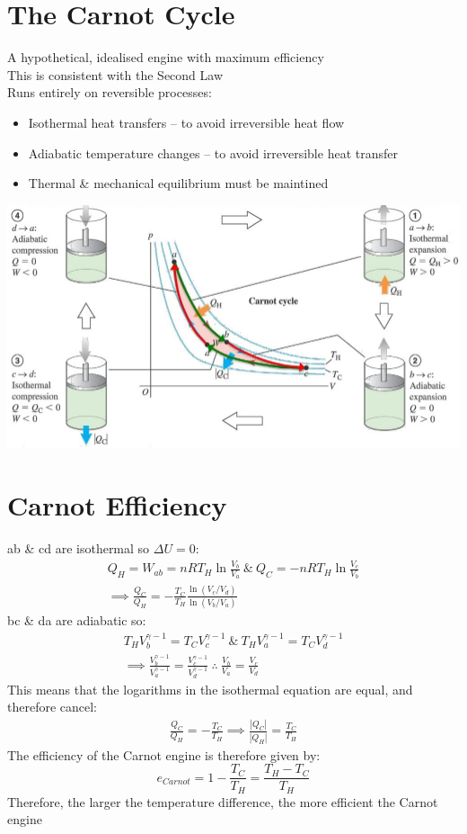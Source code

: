 \documentclass[a4paper, 11pt, fleqn, normalem]{report}
\begin{document}
\section{The Carnot Cycle}
A hypothetical, idealised engine with maximum efficiency \\
This is consistent with the Second Law \\
Runs entirely on reversible processes:
\begin{itemize}
	\item Isothermal heat transfers -- to avoid irreversible heat flow
	\item Adiabatic temperature changes -- to avoid irreversible heat transfer
	\item Thermal \& mechanical equilibrium must be maintined
\end{itemize}
\includegraphics[scale=0.55]{Carnot.jpg}

\section{Carnot Efficiency}
ab \& cd are isothermal so ${\Delta}U = 0$:
\begin{gather*}
	Q_{H} = W_{ab} = nRT_{H}\ln{\frac{V_{b}}{V_{a}}} ~\&~ Q_{C} = -nRT_{H}\ln{\frac{V_{c}}{V_{b}}} \\
	\implies \frac{Q_{C}}{Q_{H}} = -\frac{T_{C}}{T_{H}}\frac{\ln{(V_{c}/V_{d})}}{\ln{(V_{b}/V_{a})}}
\end{gather*}
bc \& da are adiabatic so:
\begin{gather*}
	T_{H}V_{b}^{\gamma - 1} = T_{C}V_{c}^{\gamma - 1} ~\&~ T_{H}V_{a}^{\gamma - 1} = T_{C}V_{d}^{\gamma - 1} \\
	\implies \frac{V_{b}^{\gamma - 1}}{V_{a}^{\gamma - 1}} = \frac{V_{c}^{\gamma - 1}}{V_{d}^{\gamma - 1}} ~\therefore~ \frac{V_{b}}{V_{a}} = \frac{V_{c}}{V_{d}}
\end{gather*}
This means that the logarithms in the isothermal equation are equal, and therefore cancel:
\begin{gather*}
	\frac{Q_{C}}{Q_{H}} = -\frac{T_{C}}{T_{H}} \implies \frac{|Q_{C}|}{|Q_{H}|} = \frac{T_{C}}{T_{H}}
\end{gather*}
The efficiency of the Carnot engine is therefore given by:
\begin{equation*}
	e_{Carnot} = 1 - \frac{T_{C}}{T_{H}} = \frac{T_{H} - T_{C}}{T_{H}}
\end{equation*}
Therefore, the larger the temperature difference, the more efficient the Carnot engine
\end{document}
